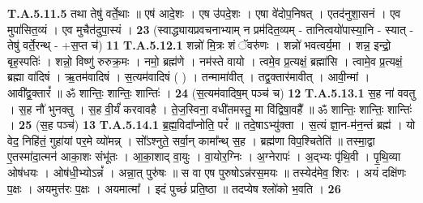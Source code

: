 \documentclass[17pt]{extarticle}
\begin{document}
                  \newline
                                                                  \textbf{ T.A.5.11.5} \newline
                  तथा तेषु॑ वर्ते॒थाः ॥ एष॑ आदे॒शः ।  एष उ॑पदे॒शः । एषा वे॑दोप॒निषत् । एतद॑नुशा॒सनं । एव मुपा॑सित॒व्यं । एव मुचैत॑दुपा॒स्यं । \textbf{ 23} \newline
                  \newline
                                                        (स्वाद्ध्यायप्रवचनाभ्याम् न प्रम॑दित॒व्यम् - तानित्वयो॑पास्या॒नि - स्यात् - तेषु॑ वर्ते॒रन्थ् - +स॒प्त च॑) \textbf{11} \newline \newline
                                \textbf{ T.A.5.12.1} \newline
                  शन्नो॑ मि॒त्रः शं ॅवरु॑णः । शन्नो॑ भवत्वर्य॒मा ।  शन्न॒ इन्द्रो॒ बृह॒स्पतिः॑ । शन्नो॒ विष्णु॑ रुरुक्र॒मः । नमो॒ ब्रह्म॑णे । नम॑स्ते वायो ।  त्वमे॒व प्र॒त्यक्षं॒ ब्रह्मा॑सि ।  त्वामे॒व प्र॒त्यक्षं॒ ब्रह्मा वा॑दिषं ।  ऋ॒तम॑वादिषं । स॒त्यम॑वादिषं ( ) । तन्मामा॑वीत् । तद्व॒क्तार॑मावीत् । आवी॒न्मां ।  आवी᳚द्व॒क्तारं᳚ ॥ ॐ शान्तिः॒ शान्तिः॒ शान्तिः॑ । \textbf{ 24} \newline
                  \newline
                                                        (स॒त्यम॑वादिष॒म् पञ्च॑ च) \textbf{12} \newline \newline
                                \textbf{ T.A.5.13.1} \newline
                  स॒ह ना॑ ववतु । स॒ह नौ॑ भुनक्तु । स॒ह वी॒र्यं॑ करवावहै । ते॒ज॒स्विना॒ वधी॑तमस्तु॒ मा वि॑द्विषा॒वहै᳚ ॥ ॐ शान्तिः॒ शान्तिः॒ शान्तिः॑ । \textbf{ 25} \newline
                  \newline
                                                        (स॒ह पञ्च॑) \textbf{13} \newline \newline
                                \textbf{ T.A.5.14.1} \newline
                  ब्र॒ह्म॒विदा᳚प्नोति॒ परं᳚ ॥  तदे॒षाऽभ्यु॑क्ता । स॒त्यं ज्ञा॒न-म॑न॒न्तं ब्रह्म॑ ।  यो वेद॒ निहि॑तं॒ गुहा॑यां पर॒मे व्यो॑मन्न् ।  सो᳚ऽश्नुते॒ सर्वा॒न् कामा᳚न्थ् स॒ह । ब्रह्म॑णा विप॒श्चितेति॑ ॥  तस्मा॒द्वा ए॒तस्मा॑दा॒त्मन॑ आका॒शः संभू॑तः । आ॒का॒शाद् वा॒युः । वा॒योर॒ग्निः । अ॒ग्नेरापः॑ । अ॒द्भ्यः पृ॑थि॒वी । पृ॒थि॒व्या ओष॑धयः ।  ओष॑धी॒भ्योऽन्नं᳚ । अन्ना॒त् पुरु॑षः ॥  स वा एष पुरुषोऽन्न॑रस॒मयः ॥ तस्येद॑मेव॒ शिरः । अयं दक्षि॑णः प॒क्षः । अयमुत्त॑रः प॒क्षः । अयमात्मा᳚ । इदं पुच्छं॑ प्रति॒ष्ठा ॥ तदप्येष श्लो॑को भ॒वति । \textbf{ 26} \newline
\end{document}
